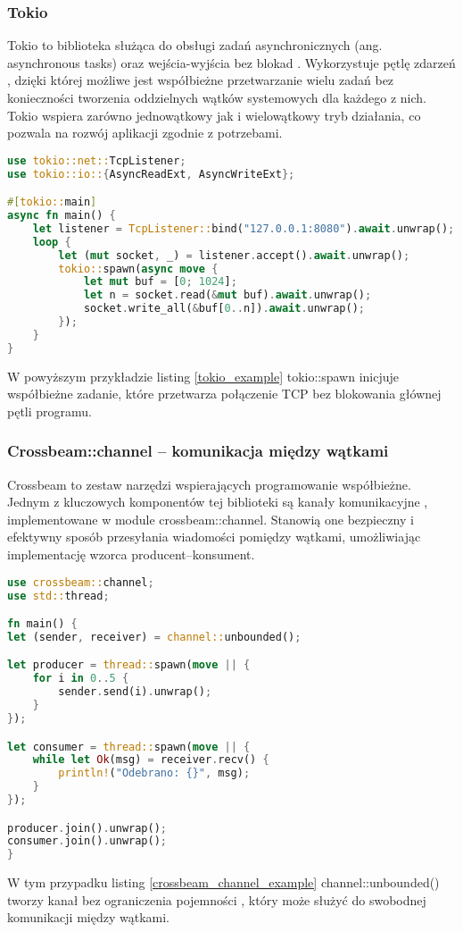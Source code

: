 \subsubsection{Tokio}
Tokio to biblioteka służąca do obsługi zadań asynchronicznych (ang. asynchronous tasks) oraz wejścia-wyjścia bez blokad . Wykorzystuje pętlę zdarzeń , dzięki której możliwe jest współbieżne przetwarzanie wielu zadań bez konieczności tworzenia oddzielnych wątków systemowych dla każdego z nich. Tokio wspiera zarówno jednowątkowy jak i wielowątkowy tryb działania, co pozwala na rozwój aplikacji zgodnie z potrzebami.

\begin{lstlisting}[language=Rust, caption=Przykład użycia Tokio, label=tokio_example]
use tokio::net::TcpListener;
use tokio::io::{AsyncReadExt, AsyncWriteExt};

#[tokio::main]
async fn main() {
    let listener = TcpListener::bind("127.0.0.1:8080").await.unwrap();
    loop {
        let (mut socket, _) = listener.accept().await.unwrap();
        tokio::spawn(async move {
            let mut buf = [0; 1024];
            let n = socket.read(&mut buf).await.unwrap();
            socket.write_all(&buf[0..n]).await.unwrap();
        });
    }
}
\end{lstlisting}
W powyższym przykładzie listing \ref{tokio_example} tokio::spawn inicjuje współbieżne zadanie, które przetwarza połączenie TCP bez blokowania głównej pętli programu.

\subsubsection{Crossbeam::channel – komunikacja między wątkami}
Crossbeam to zestaw narzędzi wspierających programowanie współbieżne. Jednym z kluczowych komponentów tej biblioteki są kanały komunikacyjne , implementowane w module crossbeam::channel. Stanowią one bezpieczny i efektywny sposób przesyłania wiadomości pomiędzy wątkami, umożliwiając implementację wzorca producent–konsument.

\begin{lstlisting}[language=Rust, caption=Przykład użycia kanałów Crossbeam, label=crossbeam_channel_example]
use crossbeam::channel;
use std::thread;

fn main() {
let (sender, receiver) = channel::unbounded();

let producer = thread::spawn(move || {
    for i in 0..5 {
        sender.send(i).unwrap();
    }
});

let consumer = thread::spawn(move || {
    while let Ok(msg) = receiver.recv() {
        println!("Odebrano: {}", msg);
    }
});

producer.join().unwrap();
consumer.join().unwrap();
}
\end{lstlisting}
W tym przypadku listing \ref{crossbeam_channel_example} channel::unbounded() tworzy kanał bez ograniczenia pojemności , który może służyć do swobodnej komunikacji między wątkami.
